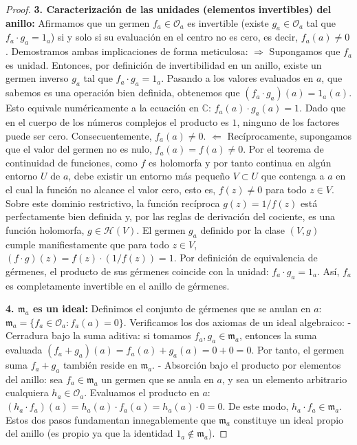 \documentclass[11pt,a4paper]{article}
\theoremstyle{definition}
\theoremstyle{remark}
\numberwithin{equation}{section}
\begin{document}
\begin{proof}
\textbf{3. Caracterización de las unidades (elementos invertibles) del anillo:}
Afirmamos que un germen $f_a \in \mathcal{O}_a$ es invertible (existe $g_a \in \mathcal{O}_a$ tal que $f_a \cdot g_a = 1_a$) si y solo si su evaluación en el centro no es cero, es decir, $f_a(a) \neq 0$.
Demostramos ambas implicaciones de forma meticulosa:
$\Rightarrow$ Supongamos que $f_a$ es unidad. Entonces, por definición de invertibilidad en un anillo, existe un germen inverso $g_a$ tal que $f_a \cdot g_a = 1_a$. Pasando a los valores evaluados en $a$, que sabemos es una operación bien definida, obtenemos que $(f_a \cdot g_a)(a) = 1_a(a)$. Esto equivale numéricamente a la ecuación en $\mathbb{C}$: $f_a(a) \cdot g_a(a) = 1$. Dado que en el cuerpo de los números complejos el producto es $1$, ninguno de los factores puede ser cero. Consecuentemente, $f_a(a) \neq 0$.
$\Leftarrow$ Recíprocamente, supongamos que el valor del germen no es nulo, $f_a(a) = f(a) \neq 0$. Por el teorema de continuidad de funciones, como $f$ es holomorfa y por tanto continua en algún entorno $U$ de $a$, debe existir un entorno más pequeño $V \subset U$ que contenga a $a$ en el cual la función no alcance el valor cero, esto es, $f(z) \neq 0$ para todo $z \in V$. Sobre este dominio restrictivo, la función recíproca $g(z) = 1/f(z)$ está perfectamente bien definida y, por las reglas de derivación del cociente, es una función holomorfa, $g \in \mathcal{H}(V)$. El germen $g_a$ definido por la clase $(V, g)$ cumple manifiestamente que para todo $z \in V$, $(f \cdot g)(z) = f(z) \cdot (1/f(z)) = 1$. Por definición de equivalencia de gérmenes, el producto de sus gérmenes coincide con la unidad: $f_a \cdot g_a = 1_a$. Así, $f_a$ es completamente invertible en el anillo de gérmenes.

\textbf{4. $\mathfrak{m}_a$ es un ideal:}
Definimos el conjunto de gérmenes que se anulan en $a$: $\mathfrak{m}_a = \{ f_a \in \mathcal{O}_a : f_a(a) = 0 \}$. Verificamos los dos axiomas de un ideal algebraico:
- Cerradura bajo la suma aditiva: si tomamos $f_a, g_a \in \mathfrak{m}_a$, entonces la suma evaluada $(f_a + g_a)(a) = f_a(a) + g_a(a) = 0 + 0 = 0$. Por tanto, el germen suma $f_a + g_a$ también reside en $\mathfrak{m}_a$.
- Absorción bajo el producto por elementos del anillo: sea $f_a \in \mathfrak{m}_a$ un germen que se anula en $a$, y sea un elemento arbitrario cualquiera $h_a \in \mathcal{O}_a$. Evaluamos el producto en $a$: $(h_a \cdot f_a)(a) = h_a(a) \cdot f_a(a) = h_a(a) \cdot 0 = 0$. De este modo, $h_a \cdot f_a \in \mathfrak{m}_a$.
Estos dos pasos fundamentan innegablemente que $\mathfrak{m}_a$ constituye un ideal propio del anillo (es propio ya que la identidad $1_a \notin \mathfrak{m}_a$).


\end{proof}
\end{document}

